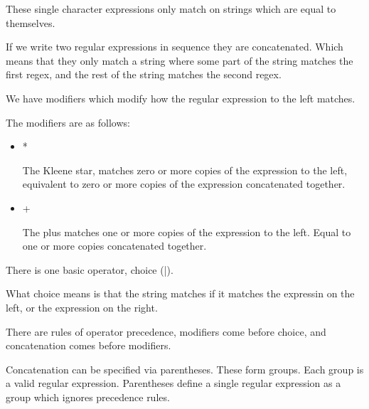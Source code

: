 \documentclass{report}
\begin{document}
\begin{description}
\begin{itemize}
\begin{mdframed}
                    These single character expressions only match
                    on strings which are equal to themselves.

                    If we write two regular expressions in sequence
                    they are concatenated. Which means that they
                    only match a string where some part of the
                    string matches the first regex, and the rest of
                    the string matches the second regex.

                    We have modifiers which modify how the regular expression
                    to the left matches.

                    The modifiers are as follows:
                    \begin{itemize}
                        \item *
                            \begin{mdframed}
                                The Kleene star, matches zero or more copies
                                of the expression to the left, equivalent
                                to zero or more copies of the expression
                                concatenated together.
                            \end{mdframed}
                        \item +
                            \begin{mdframed}
                                The plus matches one or more copies of
                                the expression to the left. Equal to one
                                or more copies concatenated together.
                            \end{mdframed}
                    \end{itemize}

                    There is one basic operator, choice (|).

                    What choice means is that the string matches if it matches the
                    expressin on the left, or the expression on the right.


                    There are rules of operator precedence, modifiers come before
                    choice, and concatenation comes before modifiers.

                    Concatenation can be specified via parentheses. These form groups.
                    Each group is a valid regular expression. Parentheses define a single
                    regular expression as a group which ignores precedence rules.
                    


\end{mdframed}
\end{itemize}
\end{description}
\end{document}

